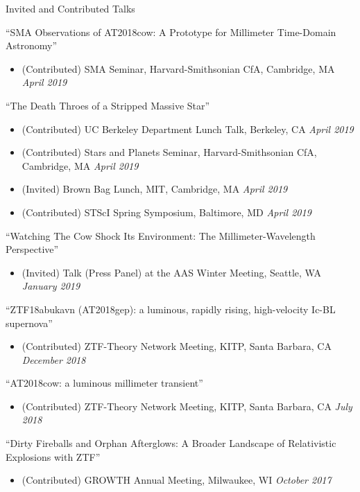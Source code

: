 \documentclass{resume} %
\begin{document}
\begin{rSection}{Invited and Contributed Talks}

``SMA Observations of AT2018cow: A Prototype for Millimeter Time-Domain Astronomy''
\begin{itemize}
  \item
    (Contributed) SMA Seminar, Harvard-Smithsonian CfA, Cambridge, MA
    \hfill {\em April 2019}
\end{itemize}

``The Death Throes of a Stripped Massive Star''
\begin{itemize}
  \item
    (Contributed) UC Berkeley Department Lunch Talk, Berkeley, CA
    \hfill {\em April 2019}
  \item
    (Contributed) Stars and Planets Seminar, Harvard-Smithsonian CfA, Cambridge, MA
    \hfill {\em April 2019}
  \item
    (Invited) Brown Bag Lunch, MIT, Cambridge, MA
    \hfill {\em April 2019}
  \item
    (Contributed) STScI Spring Symposium, Baltimore, MD
    \hfill {\em April 2019}
\end{itemize}

``Watching The Cow Shock Its Environment: The Millimeter-Wavelength Perspective''
\begin{itemize}
  \item
    (Invited) Talk (Press Panel) at the AAS Winter Meeting, Seattle, WA
    \hfill {\em January 2019}
\end{itemize}

``ZTF18abukavn (AT2018gep): a luminous, rapidly rising, high-velocity Ic-BL supernova''
\begin{itemize}
  \item
    (Contributed) ZTF-Theory Network Meeting, KITP, Santa Barbara, CA
    \hfill {\em December 2018}
\end{itemize}

``AT2018cow: a luminous millimeter transient''
\begin{itemize}
  \item
    (Contributed) ZTF-Theory Network Meeting, KITP, Santa Barbara, CA
    \hfill {\em July 2018}
\end{itemize}

``Dirty Fireballs and Orphan Afterglows: A Broader Landscape of Relativistic Explosions with ZTF''
\begin{itemize}
  \item
    (Contributed) GROWTH Annual Meeting, Milwaukee, WI
    \hfill {\em October 2017}
\end{itemize}


\end{rSection}
\end{document}
